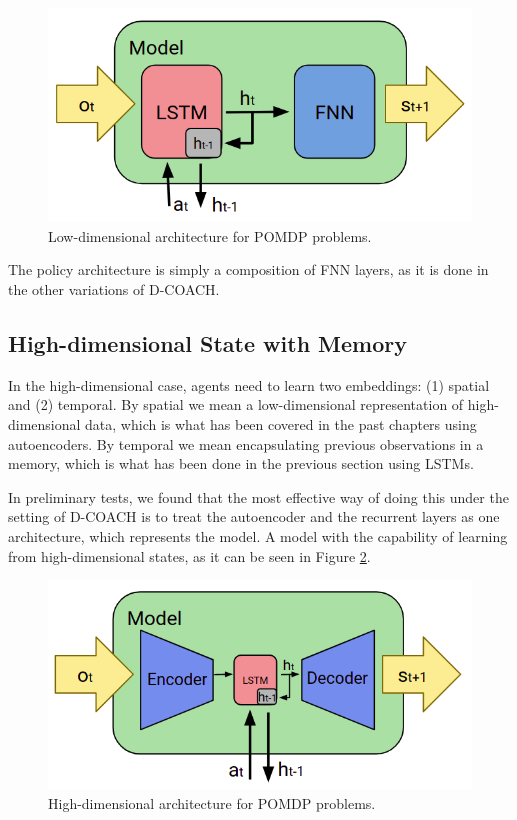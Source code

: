 \begin{figure}[h]
    \centering
    \includegraphics[width=0.7\linewidth]{imagenes/cap4/ld_model.png}
    \caption{Low-dimensional architecture for POMDP problems.}
    \label{fig:ld_model_win}
\end{figure}

The policy architecture is simply a composition of FNN layers, as it is done in the other variations of D-COACH.

\subsection{High-dimensional State with Memory}
In the high-dimensional case, agents need to learn two embeddings: (1) spatial and (2) temporal. By spatial we mean a low-dimensional representation of high-dimensional data, which is what has been covered in the past chapters using autoencoders. By temporal we mean encapsulating previous observations in a memory, which is what has been done in the previous section using LSTMs. 

In preliminary tests, we found that the most effective way of doing this under the setting of D-COACH is to treat the autoencoder and the recurrent layers as one architecture, which represents the model. A model with the capability of learning from high-dimensional states, as it can be seen in Figure \ref{fig:rnn_hd}. 

\begin{figure}[h]
    \centering
    \includegraphics[width=0.8\linewidth]{imagenes/cap4/hd_model.png}
    \caption{High-dimensional architecture for POMDP problems.}
    \label{fig:rnn_hd}
\end{figure}

